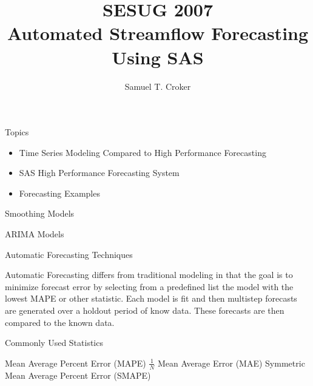\documentclass{slides}
\title{SESUG 2007 \\ Automated Streamflow Forecasting Using SAS}
\author{Samuel T. Croker}
\begin{document}
\maketitle

Topics

\begin{itemize}
\item Time Series Modeling Compared to High Performance Forecasting
\item SAS High Performance Forecasting System
\item Forecasting Examples
\end{itemize}

\newpage

Smoothing Models

\newpage

ARIMA Models

\newpage

Automatic Forecasting Techniques

Automatic Forecasting differs from traditional modeling in that the goal is to minimize forecast error by selecting from a predefined list the model with the lowest MAPE or other statistic.  Each model is fit and then multistep forecasts are generated over a holdout period of know data.  These forecasts are then compared to the known data.

Commonly Used Statistics

Mean Average Percent Error (MAPE)  $\frac{1}{N}$
Mean Average Error (MAE)
Symmetric Mean Average Percent Error (SMAPE)
\end{document}
